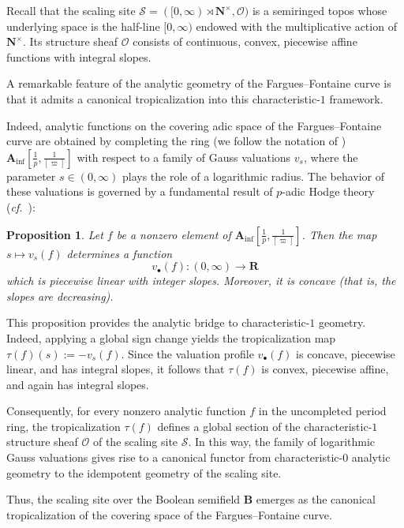 \documentclass[11pt,a4paper]{article}
\newtheorem*{prop}{Proposition}
\newcommand{\B}{\mathbf{B}}
\newcommand{\N}{\mathbf{N}}
\newcommand{\R}{\mathbf{R}}
\def\cf{{\it cf.\/}\ }
\begin{document}
Recall that the scaling site
$\mathscr S=([0,\infty)\rtimes\N^\times,\mathcal O)$
is a semiringed topos whose underlying space is the half-line $[0,\infty)$ endowed with the multiplicative action of $\N^\times$. Its structure sheaf $\mathcal O$ consists of continuous, convex, piecewise affine functions with integral slopes.

A remarkable feature of the analytic geometry of the Fargues–Fontaine curve is that it admits a canonical tropicalization into this characteristic-$1$ framework.

Indeed, analytic functions on the covering adic space of the Fargues–Fontaine curve are obtained by completing the ring (we follow the notation of \cite{FF})
$\mathbf A_{\inf}\!\left[\frac{1}{p},\frac{1}{[\varpi]}\right]$
with respect to a family of Gauss valuations $v_s$, where the parameter
$s\in(0,\infty)$
plays the role of a logarithmic radius. The behavior of these valuations is governed by a fundamental result of $p$-adic Hodge theory (\cf \cite[Lecture 11, Proposition 5]{Lurie}):


\begin{prop} Let $f$ be a nonzero element of $\mathbf{A}_{\inf}\left[\frac{1}{p}, \frac{1}{[\varpi]}\right]$. Then the map $s \mapsto v_s(f)$ determines a function
\[
v_{\bullet}(f): (0, \infty) \longrightarrow \R
\]
which is piecewise linear with integer slopes. Moreover, it is concave (that is, the slopes are decreasing).
\end{prop}

This proposition provides the analytic bridge to characteristic-$1$ geometry. Indeed, applying a global sign change yields the tropicalization map
$\tau(f)(s):=-v_s(f)$.
Since the valuation profile $v_\bullet(f)$ is concave, piecewise linear, and has integral slopes, it follows that $\tau(f)$ is convex, piecewise affine, and again has integral slopes.

Consequently, for every nonzero analytic function $f$ in the uncompleted period ring, the tropicalization $\tau(f)$ defines a global section of the characteristic-$1$ structure sheaf $\mathcal O$ of the scaling site $\mathscr S$. In this way, the family of logarithmic Gauss valuations gives rise to a canonical functor from characteristic-$0$ analytic geometry to the idempotent geometry of the scaling site.

Thus, the scaling site over the Boolean semifield $\B$ emerges as the canonical tropicalization of the covering space of the Fargues–Fontaine curve.\vspace{.05in}
\end{document}
